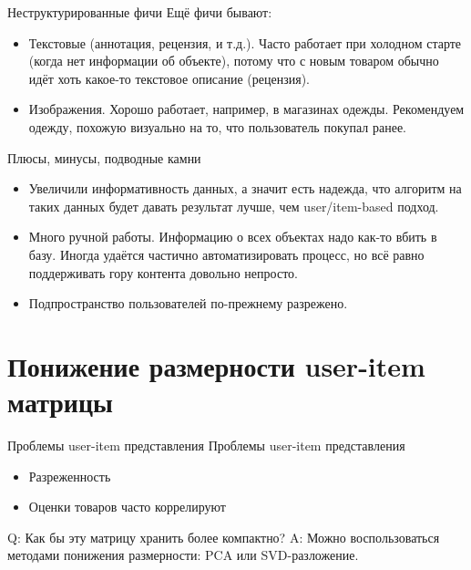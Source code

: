 \documentclass[9pt]{beamer}
\begin{document}
\begin{frame}{Неструктурированные фичи}
    Ещё фичи бывают:
    \begin{itemize}
        \item Текстовые (аннотация, рецензия, и т.д.). Часто работает при холодном старте (когда нет информации об объекте), потому что с новым товаром обычно идёт хоть какое-то текстовое описание (рецензия).
        \item Изображения. Хорошо работает, например, в магазинах одежды. Рекомендуем одежду, похожую визуально на то, что пользователь покупал ранее.
    \end{itemize}
\end{frame}

\begin{frame}{Плюсы, минусы, подводные камни}
    \begin{itemize}
        \item Увеличили информативность данных, а значит есть надежда, что алгоритм на таких данных будет давать результат лучше, чем user/item-based подход.
        \item Много ручной работы. Информацию о всех объектах надо как-то вбить в базу. Иногда удаётся частично автоматизировать процесс, но всё равно поддерживать гору контента довольно непросто.
        \item Подпространство пользователей по-прежнему разрежено.
    \end{itemize}
\end{frame}

\section{Понижение размерности user-item матрицы}

\begin{frame}{Проблемы user-item представления}
Проблемы user-item представления
    \begin{itemize}
        \item Разреженность
        \item Оценки товаров часто коррелируют
    \end{itemize}
Q: Как бы эту матрицу хранить более компактно?\newline
A: Можно воспользоваться методами понижения размерности: PCA или SVD-разложение.
\end{frame}
\end{document}
